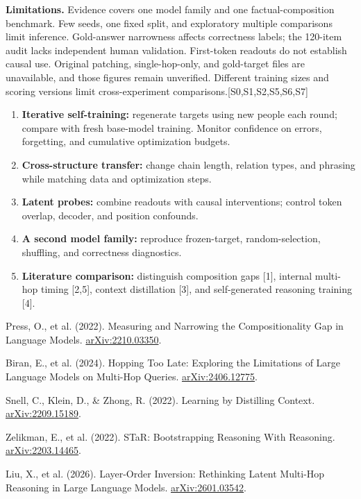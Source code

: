 \documentclass[11pt,a4paper]{article}
\newcommand{\src}[1]{{\scriptsize\color{ink}[#1]}}
\newcommand{\sub}[1]{\par\medskip\noindent{\large\bfseries\color{ink}#1}\par\smallskip}
\begin{document}
\textbf{Limitations.} Evidence covers one model family and one factual-composition benchmark. Few seeds, one fixed split, and exploratory multiple comparisons limit inference. Gold-answer narrowness affects correctness labels; the 120-item audit lacks independent human validation. First-token readouts do not establish causal use. Original patching, single-hop-only, and gold-target files are unavailable, and those figures remain unverified. Different training sizes and scoring versions limit cross-experiment comparisons.\src{S0,S1,S2,S5,S6,S7}
\sub{5\quad Next steps}
\begin{enumerate}
\item \textbf{Iterative self-training:} regenerate targets using new people each round; compare with fresh base-model training. Monitor confidence on errors, forgetting, and cumulative optimization budgets.
\item \textbf{Cross-structure transfer:} change chain length, relation types, and phrasing while matching data and optimization steps.
\item \textbf{Latent probes:} combine readouts with causal interventions; control token overlap, decoder, and position confounds.
\item \textbf{A second model family:} reproduce frozen-target, random-selection, shuffling, and correctness diagnostics.
\item \textbf{Literature comparison:} distinguish composition gaps [1], internal multi-hop timing [2,5], context distillation [3], and self-generated reasoning training [4].
\end{enumerate}
\sub{References}

{\footnotesize\raggedright\setlength{\parskip}{2pt}\noindent
[1] Press, O., et al. (2022). Measuring and Narrowing the Compositionality Gap in Language Models. \href{https://arxiv.org/abs/2210.03350}{arXiv:2210.03350}.\par\noindent
[2] Biran, E., et al. (2024). Hopping Too Late: Exploring the Limitations of Large Language Models on Multi-Hop Queries. \href{https://arxiv.org/abs/2406.12775}{arXiv:2406.12775}.\par\noindent
[3] Snell, C., Klein, D., \& Zhong, R. (2022). Learning by Distilling Context. \href{https://arxiv.org/abs/2209.15189}{arXiv:2209.15189}.\par\noindent
[4] Zelikman, E., et al. (2022). STaR: Bootstrapping Reasoning With Reasoning. \href{https://arxiv.org/abs/2203.14465}{arXiv:2203.14465}.\par\noindent
[5] Liu, X., et al. (2026). Layer-Order Inversion: Rethinking Latent Multi-Hop Reasoning in Large Language Models. \href{https://arxiv.org/abs/2601.03542}{arXiv:2601.03542}.}
\end{document}
